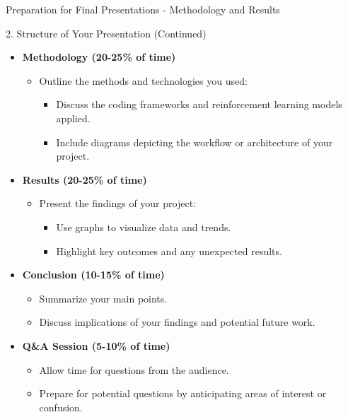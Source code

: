 \documentclass[aspectratio=169]{beamer}
\begin{document}
\begin{frame}[fragile]{Preparation for Final Presentations - Methodology and Results}
    \begin{block}{2. Structure of Your Presentation (Continued)}
        \begin{itemize}
            \item \textbf{Methodology (20-25\% of time)}
            \begin{itemize}
                \item Outline the methods and technologies you used:
                \begin{itemize}
                    \item Discuss the coding frameworks and reinforcement learning models applied.
                    \item Include diagrams depicting the workflow or architecture of your project.
                \end{itemize}
            \end{itemize}
            \item \textbf{Results (20-25\% of time)}
            \begin{itemize}
                \item Present the findings of your project:
                \begin{itemize}
                    \item Use graphs to visualize data and trends.
                    \item Highlight key outcomes and any unexpected results.
                \end{itemize}
            \end{itemize}
            \item \textbf{Conclusion (10-15\% of time)}
            \begin{itemize}
                \item Summarize your main points.
                \item Discuss implications of your findings and potential future work.
            \end{itemize}
            \item \textbf{Q\&A Session (5-10\% of time)}
            \begin{itemize}
                \item Allow time for questions from the audience.
                \item Prepare for potential questions by anticipating areas of interest or confusion.
            \end{itemize}
        \end{itemize}
    \end{block}
\end{frame}
\end{document}
